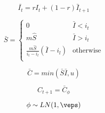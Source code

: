 \documentclass[11pt]{article}
\begin{document}
\begin{equation}
\end{equation}
\begin{equation}
\end{equation}
\begin{equation}
\end{equation}

\begin{equation}
\bar{I_t}=rI_t+(1-r)\bar{I}_{t+1}
\end{equation}
 
\begin{equation}
\bar{S} = \left\{ \begin{array}{ll}
	0                   			  &\mbox{$\bar{I} < i_t$} \\
	m\hat{S}            			  &\mbox{$\bar{I} > i_t$} \\
	\frac{m\hat{S}}{i_t-i_l}(\bar{I}-i_l)     &\mbox{otherwise}\\
		  \end{array}
	  \right.
\end{equation}


\begin{equation}
\bar{C}=min(\bar{S}\bar{I},u)
\end{equation}

\begin{equation}
C_{t+1} = \bar{C}_\phi
\end{equation}

\begin{equation}
\phi \sim LN(1,\veps)
\end{equation}



\end{document}

